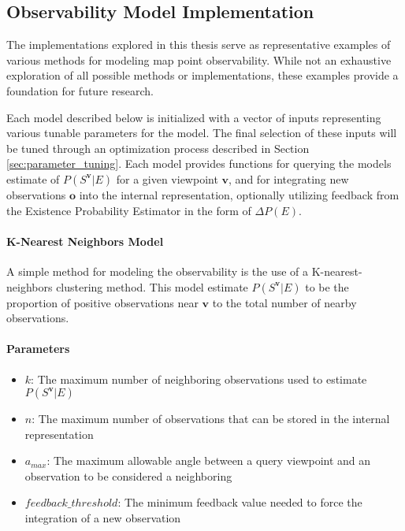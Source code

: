 \subsection{Observability Model Implementation}
\label{sec:observability_models}

The implementations explored in this thesis serve as representative examples of various methods for modeling map point observability. While not an exhaustive exploration of all possible methods or implementations, these examples provide a foundation for future research.

Each model described below is initialized with a vector of inputs representing various tunable parameters for the model. The final selection of these inputs will be tuned through an optimization process described in Section \ref{sec:parameter_tuning}. Each model provides functions for querying the models estimate of $P(S^{\boldsymbol{v}}|E)$ for a given viewpoint $\boldsymbol{v}$, and for integrating new observations $\boldsymbol{o}$ into the internal representation, optionally utilizing feedback from the Existence Probability Estimator in the form of $\Delta P(E)$.

\paragraph{K-Nearest Neighbors Model}

A simple method for modeling the observability is the use of a K-nearest-neighbors clustering method. This model estimate $P(S^{\boldsymbol{v}}|E)$ to be the proportion of positive observations near $\boldsymbol{v}$ to the total number of nearby observations.

\begin{singlespace}
  \paragraph{Parameters}
  \begin{itemize}
    \item $k$: The maximum number of neighboring observations used to estimate $P(S^{\boldsymbol{v}}|E)$
    \item $n$: The maximum number of observations that can be stored in the internal representation
    \item $a_{max}$: The maximum allowable angle between a query viewpoint and an observation to be considered a neighboring
    \item $feedback\_threshold$: The minimum feedback value needed to force the integration of a new observation
  \end{itemize}
\end{singlespace}

